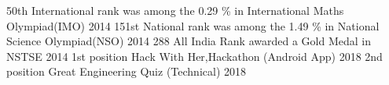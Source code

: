 \begin{cvhonors}
  \cvhonor
    {50th International rank}
    {was among the 0.29 \% in International Maths Olympiad(IMO)}
    {}
    {2014}
  \cvhonor
    {151st National rank}
    {was among the 1.49 \% in National Science Olympiad(NSO)}
    {}
    {2014}
  \cvhonor
    {288 All India Rank}
    {awarded a Gold Medal in NSTSE}
    {}
    {2014}
  \cvhonor
  {1st position}
  {Hack With Her,Hackathon (Android App)}
  {}
  {2018}
  \cvhonor
  {2nd position}
  {Great Engineering Quiz (Technical)}
  {}
  {2018}
\end{cvhonors}


